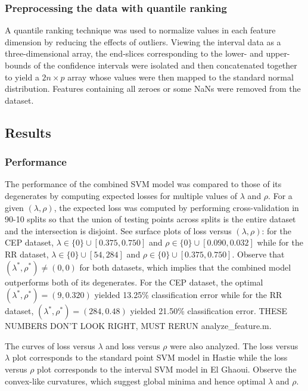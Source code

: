 \documentclass[11pt]{article}
\begin{document}
\subsubsection{Preprocessing the data with quantile ranking}
A quantile ranking technique was used to normalize values in each feature dimension by reducing the effects of outliers. Viewing the interval data as a three-dimensional array, the end-slices corresponding to the lower- and upper-bounds of the confidence intervals were isolated and then concatenated together to yield a $2n\times p$ array whose values were then mapped to the standard normal distribution. Features containing all zeroes or some NaNs were removed from the dataset.

\subsection{Results}

\subsubsection{Performance}
The performance of the combined SVM model was compared to those of its degenerates by computing expected losses for multiple values of $\lambda$ and $\rho$.  For a given $(\lambda,\rho)$, the expected loss was computed by performing cross-validation in 90-10 splits so that the union of testing points across splits is the entire dataset and the intersection is disjoint. See surface plots of loss versus $(\lambda,\rho)$: for the CEP dataset, $\lambda\in \lbrace 0\rbrace\cup [0.375,0.750]$ and $\rho\in\lbrace 0\rbrace\cup [0.090,0.032]$ while for the RR dataset, $\lambda\in\lbrace 0\rbrace\cup [54,284]$ and $\rho\in\lbrace 0\rbrace\cup [0.375,0.750]$. Observe that $(\lambda^*,\rho^*)\neq (0,0)$ for both datasets, which implies that the combined model outperforms both of its degenerates. For the CEP dataset, the optimal $(\lambda^*,\rho^*)=(9,0.320)$ yielded 13.25\% classification error while for the RR dataset, $(\lambda^*,\rho^*)=(284,0.48)$ yielded 21.50\% classification error. THESE NUMBERS DON'T LOOK RIGHT, MUST RERUN analyze\_feature.m.

The curves of loss versus $\lambda$ and loss versus $\rho$ were also analyzed.  The loss versus $\lambda$ plot corresponds to the standard point SVM model in Hastie while the loss versus $\rho$ plot corresponds to the interval SVM model in El Ghaoui. Observe the convex-like curvatures, which suggest global minima and hence optimal $\lambda$ and $\rho$. 
\end{document}
